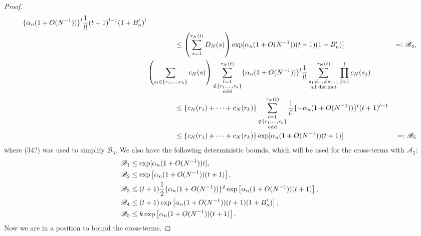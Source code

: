 \documentclass{article}
\newcommand{\1}[1]{\mathbbm{1}_{#1}}
\begin{document}
\begin{proof}
\begin{align}
\{ \alpha_n (1+O(N^{-1})) \}^l \frac{1}{l!} (t+1)^{l-1} (1 + B_n^\prime)^l \notag\\
&\qquad\qquad \leq \left( \sum_{s=1}^{\tau_N(t)} D_N(s) \right)
\exp[ \alpha_n (1+O(N^{-1})) (t+1) (1+B_n^\prime) ]
&=: \mathscr{B}_4, \notag\\
& \left( \sum_{s_l \in \{r_1, \dots, r_k\} } c_N(s) \right)
\sum_{\substack{l=1 \\ \notin \{r_1,\dots,r_k\} \\ \text{odd} }}^{\tau_N(t)}
\{ \alpha_n (1+O(N^{-1})) \}^l \frac{1}{l!}
\sum_{\substack{s_1\neq \dots \neq s_{l-1} \\ \text{all distinct} }}^{\tau_N(t)}
\prod_{j=1}^l c_N(s_j) \notag\\
&\qquad\qquad \leq \{ c_N(r_1) + \cdots + c_N(r_k) \}
\sum_{\substack{l=1 \\ \notin \{r_1,\dots,r_k\} \\ \text{odd} }}^{\tau_N(t)}
\frac{1}{l!} \{ - \alpha_n (1+O(N^{-1})) \}^l (t+1)^{l-1} \notag\\
&\qquad\qquad \leq \{ c_N(r_1) + \cdots + c_N(r_k) \}
\exp[ \alpha_n (1 + O(N^{-1})) (t+1) ]
&=: \mathscr{B}_5
\end{align}
where (34?) was used to simplify $\mathscr{B}_5$.
We also have the following deterministic bounds, which will be used for the cross-terms with $\mathscr{A}_2$:
\begin{align}
& \mathscr{B}_1 \leq \exp[ \alpha_n (1+O(N^{-1})) t ] , \notag\\
& \mathscr{B}_2 \leq \exp\left[ \alpha_n (1+O(N^{-1})) (t+1) \right] , \notag\\
& \mathscr{B}_3 \leq (t+1) \frac{1}{2} \{ \alpha_n (1+O(N^{-1})) \}^2 \exp\left[ \alpha_n (1+O(N^{-1})) (t+1) \right] , \notag\\
& \mathscr{B}_4 \leq (t+1) \exp\left[ \alpha_n (1+O(N^{-1})) (t+1) (1 + B_n^\prime) \right] , \notag\\
& \mathscr{B}_5 \leq k \exp\left[ \alpha_n (1+O(N^{-1})) (t+1) \right] .
\end{align}
Now we are in a position to bound the cross-terms.


\end{proof}
\end{document}
